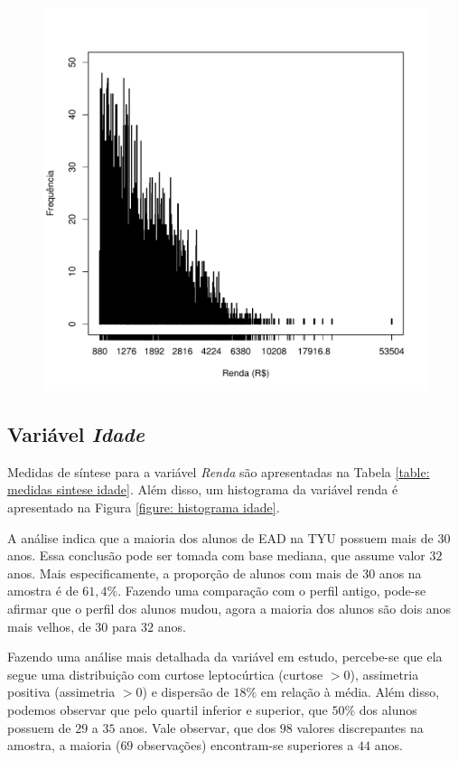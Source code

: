 \documentclass[10pt,a4paper,oneside]{article}
\begin{document}
\begin{figure}[h]
\begin{minipage}{0.46\textwidth}
	\includegraphics[width=\linewidth]{plots/histograma-renda}
	\label{figure: histograma renda}
\end{minipage}
\end{figure}

\clearpage
\subsection*{Variável \textit{Idade}}

Medidas de síntese para a variável \textit{Renda} são apresentadas na Tabela \ref{table: medidas sintese idade}. Além disso, um histograma da variável renda é apresentado na Figura \ref{figure: histograma idade}.

A análise indica que a maioria dos alunos de EAD na TYU possuem mais de $30$ anos. Essa conclusão pode ser tomada com base mediana, que assume valor $32$ anos. Mais especificamente, a proporção de alunos com mais de 30 anos na amostra é de $61,4\%$. Fazendo uma comparação com o perfil antigo, pode-se afirmar que o perfil dos alunos mudou, agora a maioria dos alunos são dois anos mais velhos, de $30$ para $32$ anos.

Fazendo uma análise mais detalhada da variável em estudo, percebe-se que ela segue uma distribuição com curtose leptocúrtica (curtose $> 0$), assimetria positiva (assimetria $> 0$) e dispersão de $18\%$ em relação à média. Além disso, podemos observar que pelo quartil inferior e superior, que $50\%$  dos alunos possuem de $29$ a $35$ anos. Vale observar, que dos $98$ valores discrepantes na amostra, a maioria ($69$ observações) encontram-se superiores a $44$ anos.
\end{document}
